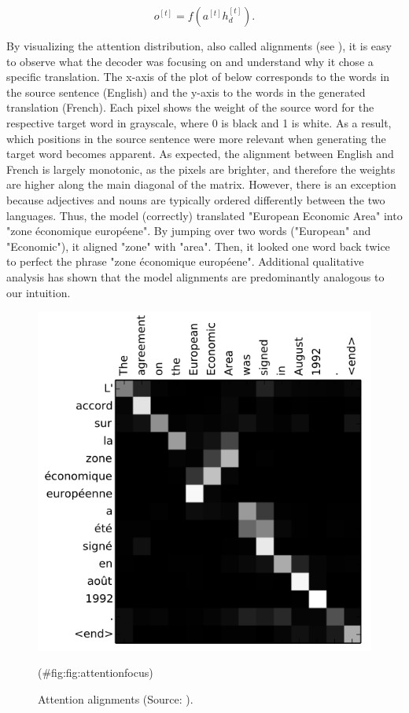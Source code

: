 \documentclass[
]{krantz}
\begin{document}
\[o^{[t]} = f(a^{[t]} h_d^{[t]}).\]

By visualizing the attention distribution, also called alignments (see
\citep{Bahdanau2014}), it is easy to observe what the decoder was focusing on
and understand why it chose a specific translation. The x-axis of the
plot of below corresponds to the words in the source sentence (English)
and the y-axis to the words in the generated translation (French). Each
pixel shows the weight of the source word for the respective target word
in grayscale, where 0 is black and 1 is white. As a result, which
positions in the source sentence were more relevant when generating the
target word becomes apparent. As expected, the alignment between English
and French is largely monotonic, as the pixels are brighter, and
therefore the weights are higher along the main diagonal of the matrix.
However, there is an exception because adjectives and nouns are
typically ordered differently between the two languages. Thus, the model
(correctly) translated "European Economic Area" into "zone économique
européene". By jumping over two words ("European" and "Economic"),
it aligned "zone" with "area". Then, it looked one word back twice
to perfect the phrase "zone économique européene". Additional
qualitative analysis has shown that the model alignments are
predominantly analogous to our intuition.\\

\begin{figure}

{\centering \includegraphics[width=0.5\linewidth]{./figures/01-01-nlp/attention_focus_bahdanau} 

}

\caption{Attention alignments (Source: \citet{Bahdanau2014}).}(\#fig:fig:attentionfocus)
\end{figure}
\end{document}
